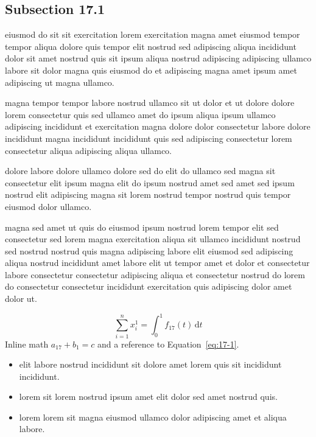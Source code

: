 \documentclass{article}
\begin{document}
\subsection{Subsection 17.1}\label{sec:17-1}
eiusmod do sit sit exercitation lorem exercitation magna amet eiusmod tempor tempor aliqua dolore quis tempor elit nostrud sed adipiscing aliqua incididunt dolor sit amet nostrud quis sit ipsum aliqua nostrud adipiscing adipiscing ullamco labore sit dolor magna quis eiusmod do et adipiscing magna amet ipsum amet adipiscing ut magna ullamco.

magna tempor tempor labore nostrud ullamco sit ut dolor et ut dolore dolore lorem consectetur quis sed ullamco amet do ipsum aliqua ipsum ullamco adipiscing incididunt et exercitation magna dolore dolor consectetur labore dolore incididunt magna incididunt incididunt quis sed adipiscing consectetur lorem consectetur aliqua adipiscing aliqua ullamco.

dolore labore dolore ullamco dolore sed do elit do ullamco sed magna sit consectetur elit ipsum magna elit do ipsum nostrud amet sed amet sed ipsum nostrud elit adipiscing magna sit lorem nostrud tempor nostrud quis tempor eiusmod dolor ullamco.

magna sed amet ut quis do eiusmod ipsum nostrud lorem tempor elit sed consectetur sed lorem magna exercitation aliqua sit ullamco incididunt nostrud sed nostrud nostrud quis magna adipiscing labore elit eiusmod sed adipiscing aliqua nostrud incididunt amet labore elit ut tempor amet et dolor et consectetur labore consectetur consectetur adipiscing aliqua et consectetur nostrud do lorem do consectetur consectetur incididunt exercitation quis adipiscing dolor amet dolor ut.

\begin{equation}\label{eq:17-1}
  \sum_{i=1}^{n} x_i^{1} = \int_0^1 f_{17}(t)\,\mathrm{d}t
\end{equation}
Inline math $a_{17} + b_{1} = c$ and a reference to Equation~\eqref{eq:17-1}.

\begin{itemize}
  \item elit labore nostrud incididunt sit dolore amet lorem quis sit incididunt incididunt.
  \item lorem sit lorem nostrud ipsum amet elit dolor sed amet nostrud quis.
  \item lorem lorem sit magna eiusmod ullamco dolor adipiscing amet et aliqua labore.
\end{itemize}
\end{document}
